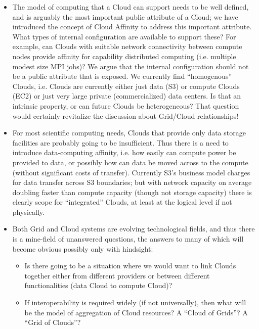 \documentclass[conference,final]{IEEEtran}
\begin{document}
 \begin{itemize}

  \item The model of computing that a Cloud can support needs to be
  well defined, and is arguably the most important public attribute of
  a Cloud; we have introduced the concept of Cloud Affinity to address
  this important attribute.  What types of internal configuration are
  available to support these?  For example, can Clouds with suitable
  network connectivity between compute nodes provide affinity for
  capability distributed computing (i.e. multiple modest size MPI
  jobs)?  We argue that the internal configuration should not be a
  public attribute that is exposed.  We currently find ``homogenous''
  Clouds, i.e. Clouds are currently either just data (S3) or compute
  Clouds (EC2) or just very large private (commercialized) data
  centers.  Is that an intrinsic property, or can future Clouds be
  heterogeneous?  That question would certainly revitalize the
  discussion about Grid/Cloud relationships!

  \item For most scientific computing needs, Clouds that provide only
  data storage facilities are probably going to be insufficient.  Thus
  there is a need to introduce data-computing affinity, i.e. how
  easily can compute power be provided to data, or possibly how can
  data be moved across to the compute (without significant costs of
  transfer).  Currently S3's business model charges for data transfer
  across S3 boundaries; but with network capacity on average doubling
  faster than compute capacity (though not storage capacity) there is
  clearly scope for ``integrated'' Clouds, at least at the logical
  level if not physically.
 
  \item Both Grid and Cloud systems are evolving technological fields,
  and thus there is a mine-field of unanswered questions, the answers
  to many of which will become obvious possibly only with hindsight:
  \\[-1.5em]
  
   \begin{itemize}
  
    \item Is there going to be a situation where we would want to link
    Clouds together either from different providers or between
    different functionalities (data Cloud to compute Cloud)?  
  
    \item If interoperability is required widely (if not universally),
    then what will be the model of aggregation of Cloud resources? A
    ``Cloud of Grids''?  A ``Grid of Clouds''?  
  

\end{itemize}
\end{itemize}
\end{document}

